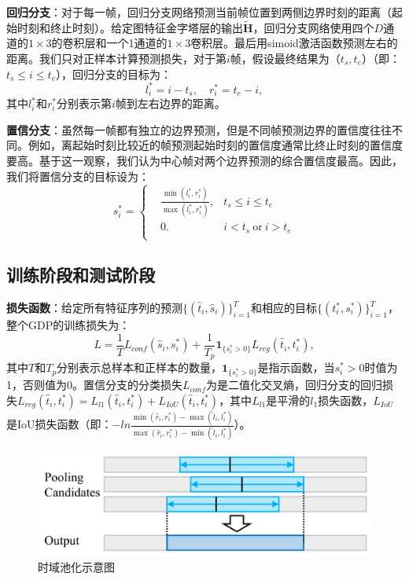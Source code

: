 \textbf{回归分支}：对于每一帧，回归分支网络预测当前帧位置到两侧边界时刻的距离（起始时刻和终止时刻）。给定图特征金字塔层的输出$\tilde{\bm{H}}$，回归分支网络使用四个$D$通道的$1\times 3$的卷积层和一个1通道的$1\times 3$卷积层。最后用simoid激活函数预测左右的距离。我们只对正样本计算预测损失，对于第$i$帧，假设最终结果为（$t_s, t_e$）（即：$t_s \leq i \leq t_e$），回归分支的目标为：
\begin{equation}
    l^*_i = i - t_s, \quad r^*_i = t_e - i,
\end{equation}
其中$l^*_i$和$r^*_i$分别表示第$i$帧到左右边界的距离。


\textbf{置信分支}：虽然每一帧都有独立的边界预测，但是不同帧预测边界的置信度往往不同。例如，离起始时刻比较近的帧预测起始时刻的置信度通常比终止时刻的置信度要高。基于这一观察，我们认为中心帧对两个边界预测的综合置信度最高。因此，我们将置信分支的目标设为：
\begin{equation}
s^*_i=\left\{
    \begin{aligned}
        & \frac{\min(l^*_i, r^*_i)}{\max(l^*_i, r^*_i)}, & t_s \leq i \leq t_e \\
        & 0.  & i < t_s ~\text{or}~ i > t_e \\
    \end{aligned}
    \right.
\end{equation}


\subsection{训练阶段和测试阶段}

\textbf{损失函数}：给定所有特征序列的预测$\{(\hat{t}_i, \hat{s}_i)\}^T_{i=1}$和相应的目标$\{(t^*_i, s^*_i)\}^T_{i=1}$，整个GDP的训练损失为：
\begin{equation}
    L = \frac{1}{T}L_{conf}(\hat{s}_i, s^*_i) + \frac{1}{T_p}\mathbf{1}_{\{s^*_i>0\}}L_{reg}(\hat{t}_i, t^*_i),
\end{equation}
其中$T$和$T_p$分别表示总样本和正样本的数量，$\mathbf{1}_{\{s^*_i>0\}}$是指示函数，当$s^*_i>0$时值为1，否则值为0。置信分支的分类损失$L_{conf}$为是二值化交叉熵，回归分支的回归损失$L_{reg}(\hat{t}_i, t^*_i) = L_{l1}(\hat{t}_i, t^*_i) + L_{IoU}(\hat{t}_i, t^*_i)$，其中$L_{l1}$是平滑的$l_1$损失函数，$L_{IoU}$是IoU损失函数（即：$-ln\frac{\min(\hat{r}_i, r^*_i)-\max(\hat{l}_i, l^*_i)}{\max(\hat{r}_i, r^*_i)-\min(\hat{l}_i, l^*_i)}$）。


\begin{figure}[tbp]
    \centering
    \includegraphics[width=0.7\linewidth]{chapter6/res/temporal_pooling.pdf}
    \caption{时域池化示意图}
    \label{ch6:fig:temporal_pooling}
\end{figure}


